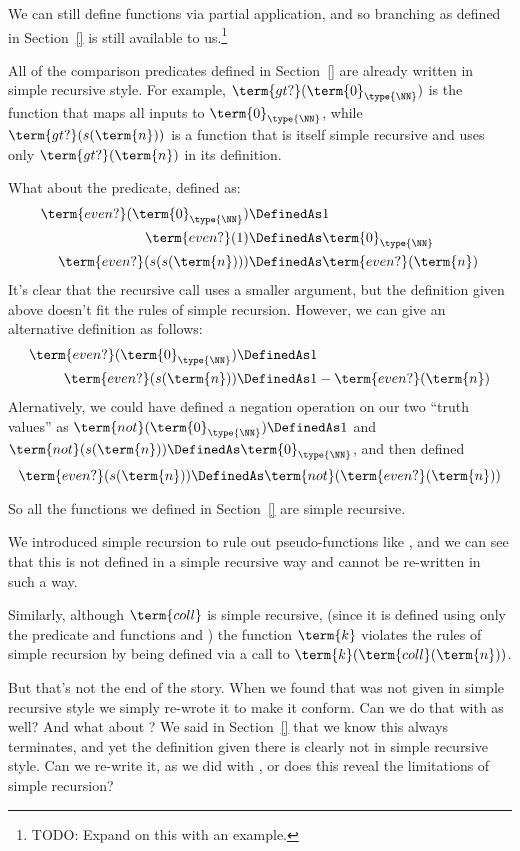 We can still define functions via partial application, and so branching as defined in Section~\ref{} is still available to us.\footnote{
TODO: Expand on this with an example.
}

All of the comparison predicates defined in Section~\ref{} are already written in simple recursive style.  For example, $\term{gt?}(\term{0}_{\type{\NN}})$ is the function that maps all inputs to $\term{0}_{\type{\NN}}$, while $\term{gt?}(s(\term{n}))$ is a function that is itself simple recursive and uses only $\term{gt?}(\term{n})$ in its definition.

What about the  predicate, defined as:
\begin{align*}
\term{even?}(\term{0}_{\type{\NN}}) &\DefinedAs 
1
\\
\term{even?}(1) &\DefinedAs 
\term{0}_{\type{\NN}}
\\
\term{even?}(s(s(\term{n}))) &\DefinedAs
\term{even?}(\term{n})
\end{align*}
It's clear that the recursive call uses a smaller argument, but the definition given above doesn't fit the rules of simple recursion.  However, we can give an alternative definition as follows:
\begin{align*}
\term{even?}(\term{0}_{\type{\NN}}) &\DefinedAs 
1
\\
\term{even?}(s(\term{n})) &\DefinedAs
1  - \term{even?}(\term{n})
\end{align*}
Alernatively, we could have defined a negation operation  on our two ``truth values'' as
$\term{not}(\term{0}_{\type{\NN}}) \DefinedAs 1$ and 
$\term{not}(s(\term{n})) \DefinedAs \term{0}_{\type{\NN}}$, and 
then defined 
\[
\term{even?}(s(\term{n})) \DefinedAs
\term{not}(\term{even?}(\term{n}))
\]

So all the functions we defined in Section~\ref{} are simple recursive.  

We introduced simple recursion to rule out pseudo-functions like , and we can see that this is not defined in a simple recursive way and cannot be re-written in such a way.

Similarly, although $\term{coll}$ is simple recursive, (since it is defined using only the  predicate and functions  and ) the function $\term{k}$ violates the rules of simple recursion by being defined via a call to $\term{k}(\term{coll}(\term{n}))$.

But that's not the end of the story.  When we found that  was not given in simple recursive style we simply re-wrote it to make it conform.  Can we do that with  as well?  And what about ?  We said in Section~\ref{} that we know this always terminates, and yet the definition given there is clearly not in simple recursive style.  Can we re-write it, as we did with , or does this reveal the limitations of simple recursion?

